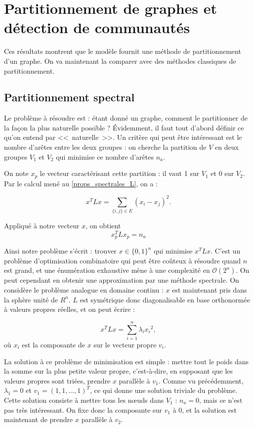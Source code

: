 \documentclass[12pt]{article}
\begin{document}
\section{Partitionnement de graphes et détection de communautés}
\label{sec:spectral}
Ces résultats montrent que le modèle fournit une méthode de
partitionnement d'un graphe. On va maintenant la comparer avec des
méthodes classiques de partitionnement.

\subsection{Partitionnement spectral}
Le problème à résoudre est : étant donné un graphe, comment le
partitionner de la façon la plus naturelle possible ? Évidemment, il
faut tout d'abord définir ce qu'on entend par <<~naturelle~>>. Un
critère qui peut être intéressant est le nombre d'arêtes entre les
deux groupes : on cherche la partition de $V$ en deux groupes $V_1$ et
$V_2$ qui minimise ce nombre d'arêtes $n_a$.

On note $x_p$ le vecteur caractérisant cette partition : il vaut 1 sur
$V_1$ et 0 sur $V_2$. Par le calcul mené au \ref{props_spectrales_L},
on a :

\begin{equation}
 x^T L x = \sum_{\{i, j\} \in E} (x_i - x_j)^2.
\end{equation}

Appliqué à notre vecteur $x$, on obtient
\begin{equation}
 x_p^T L x_p = n_a
\end{equation}

Ainsi notre problème s'écrit : trouver $x \in \{0,1\}^n$ qui
minimise $x^T L x$. C'est un problème d'optimisation combinatoire
qui peut être coûteux à résoudre quand $n$ est grand, et une
énumération exhaustive mène à une complexité en $\mathcal O (2^n)$. On peut
cependant en obtenir une approximation par une méthode spectrale. On
considère le problème analogue en domaine continu : $x$ est
maintenant pris dans la sphère unité de $R^n$. $L$ est symétrique donc
diagonalisable en base orthonormée à valeurs propres réelles, et on
peut écrire :

\begin{equation}
 x^T L x = \sum_{i=1}^n \lambda_i {x_i}^2,
\end{equation}
où $x_i$ est la composante de $x$ sur le vecteur propre $v_i$.

La solution à ce problème de minimisation est simple : mettre tout le
poids dans la somme sur la plus petite valeur propre, c'est-à-dire, en
supposant que les valeurs propres sont triées, prendre $x$ parallèle à
$v_1$. Comme vu précédemment, $\lambda_1 = 0$ et $v_1 = (1, 1, \dots,
1)^T$, ce qui donne une solution triviale du problème. Cette solution
consiste à mettre tous les n\oe uds dans $V_1$ : $n_a = 0$, mais ce
n'est pas très intéressant. On fixe donc la composante sur $v_1$ à 0,
et la solution est maintenant de prendre $x$ parallèle à $v_2$.
\end{document}

